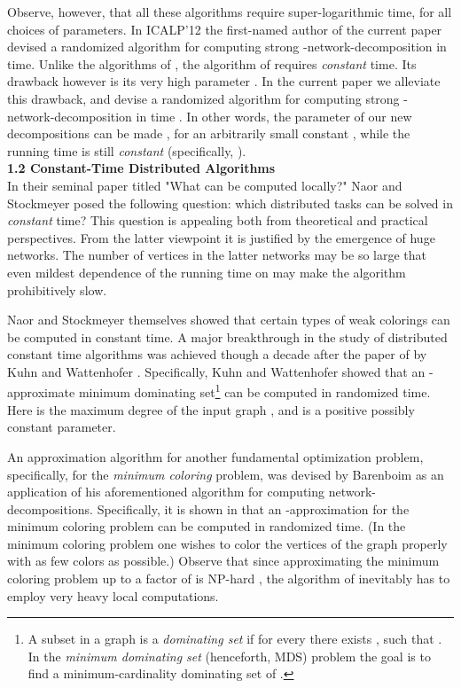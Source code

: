 \documentclass[11pt]{article}
\begin{document}
Observe, however, that all these algorithms \cite{AGLP89,PS95,LS92} require super-logarithmic time, for all choices of parameters. In ICALP'12 the first-named author of the current paper \cite{B12} devised a randomized algorithm for computing strong -network-decomposition in  time. Unlike the algorithms of \cite{AGLP89,PS95,LS92}, the algorithm of \cite{B12} requires {\em constant} time. Its drawback however is its very high parameter . In the current paper we alleviate this drawback, and devise a randomized algorithm for computing strong -network-decomposition in time . In other words, the parameter  of our new decompositions can be made , for an arbitrarily small constant , while the running time is still {\em constant} (specifically, ).\\ 
{\bf 1.2 Constant-Time Distributed Algorithms}\\
In their seminal paper titled "What can be computed locally?" \cite{NS93} Naor and Stockmeyer posed the following question: which distributed tasks can be solved in {\em constant} time? 
This question is appealing both from theoretical and practical perspectives. From the latter viewpoint it is justified by the emergence of huge networks. The number of vertices in the latter networks may be so large that even mildest dependence of the running time on  may make the algorithm prohibitively slow.

Naor and Stockmeyer themselves \cite{NS93} showed that certain types of weak colorings can be computed in constant time. A major breakthrough in the study of distributed constant time algorithms was achieved though a decade after the paper of \cite{NS93} by Kuhn and Wattenhofer \cite{KW05}. Specifically, Kuhn and Wattenhofer \cite{KW05} showed that an -approximate minimum dominating set\footnote[1]{A subset  in a graph  is a {\em dominating set} if for every  there exists , such that . In the {\em minimum dominating set} (henceforth, MDS) problem the goal is to find a minimum-cardinality dominating set of .}
 can be computed in  randomized time. Here  is the maximum degree of the input graph , and  is a positive possibly constant parameter.

An approximation algorithm for another fundamental optimization problem, specifically, for the {\em minimum coloring} problem, was devised by Barenboim \cite{B12} as an application of his aforementioned algorithm for computing network-decompositions. Specifically, it is shown in \cite{B12} that an -approximation for the minimum coloring problem can be computed in  randomized time. (In the minimum coloring problem one wishes to color the vertices of the graph properly with as few colors as possible.) Observe that since approximating the minimum coloring problem up to a factor of  is NP-hard \cite{H96,FK98,Z07}, the algorithm of \cite{B12} inevitably has to employ very heavy local computations.
\end{document}
